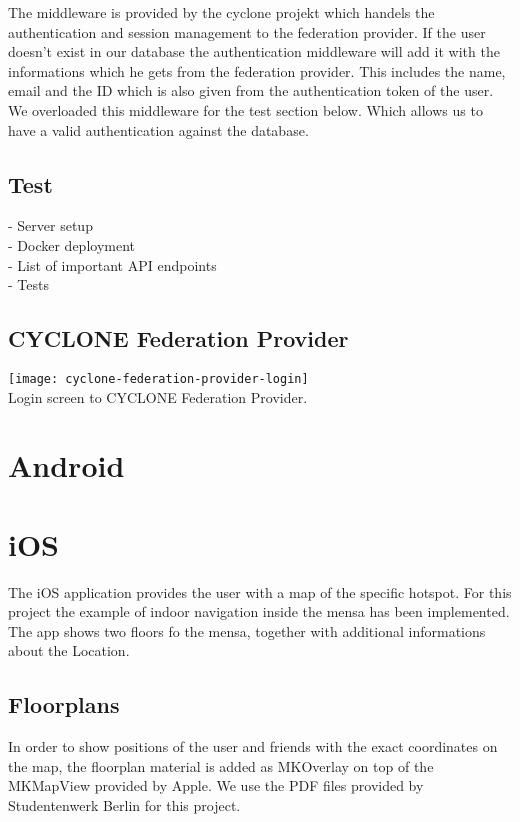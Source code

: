 The middleware is provided by the cyclone projekt which handels the authentication and session management to the federation provider. If the user doesn't exist in our database the authentication middleware will add it with the informations which he gets from the federation provider. This includes the name, email and the ID which is also given from the authentication token of the user. We overloaded this middleware for the test section below. Which allows us to have a valid authentication against the database.

\subsection{Test}

- Server setup\\
- Docker deployment\\
- List of important API endpoints\\
- Tests

\subsection{CYCLONE Federation Provider}
\label{federation-provider}

\begin{center}
    \texttt{[image: cyclone-federation-provider-login]}\\
    Login screen to CYCLONE Federation Provider.
\end{center}


\vspace{0.5cm}

\section{Android}




\vspace{0.5cm}

\section{iOS}


The iOS application provides the user with a map of the specific hotspot. For this project the example of indoor navigation inside the mensa has been implemented. The app shows two floors fo the mensa, together with additional informations about the Location.

\subsection{Floorplans}
In order to show positions of the user and friends with the exact coordinates on the map, the floorplan material is added as MKOverlay on top of the MKMapView provided by Apple. We use the PDF files provided by Studentenwerk Berlin for this project. 

